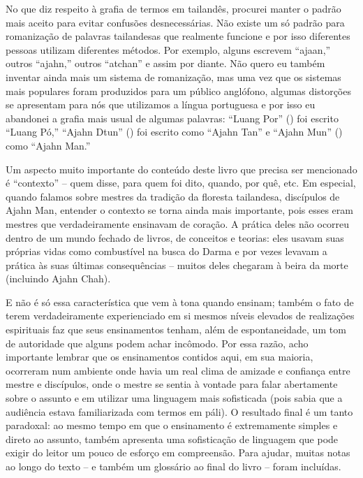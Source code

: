 No que diz respeito à grafia de termos em tailandês, procurei manter
o padrão mais aceito para evitar confusões desnecessárias. Não existe
um só padrão para romanização de palavras tailandesas que realmente
funcione e por isso diferentes pessoas utilizam diferentes métodos. Por
exemplo, alguns escrevem “ajaan,” outros “ajahn,” outros “atchan” e
assim por diante. Não quero eu também inventar ainda mais um sistema de
romanização, mas uma vez que os sistemas mais populares foram
produzidos para um público anglófono, algumas distorções se apresentam
para nós que utilizamos a língua portuguesa e por isso eu abandonei a
grafia mais usual de algumas palavras: “Luang Por” () foi escrito “Luang Pó,” “Ajahn Dtun” ()
foi escrito como “Ajahn Tan” e “Ajahn Mun” ()
como “Ajahn Man.” 

Um aspecto muito importante do conteúdo deste livro que precisa ser
mencionado é “contexto” – quem disse, para quem foi dito, quando, por
quê, etc. Em especial, quando falamos sobre mestres da tradição da
floresta tailandesa, discípulos de Ajahn Man, entender o contexto se
torna ainda mais importante, pois esses eram mestres que
verdadeiramente ensinavam de coração. A prática deles não ocorreu
dentro de um mundo fechado de livros, de conceitos e teorias: eles
usavam suas próprias vidas como combustível na busca do Darma e por
vezes levavam a prática às suas últimas consequências – muitos deles
chegaram à beira da morte (incluindo Ajahn Chah). 

E não é só essa característica que vem à tona quando ensinam; também
o fato de terem verdadeiramente experienciado em si mesmos níveis
elevados de realizações espirituais faz que seus ensinamentos tenham,
além de espontaneidade, um tom de autoridade que alguns podem achar
incômodo. Por essa razão, acho importante lembrar que os ensinamentos
contidos aqui, em sua maioria, ocorreram num ambiente onde havia um
real clima de amizade e confiança entre mestre e discípulos, onde o
mestre se sentia à vontade para falar abertamente sobre o assunto e em
utilizar uma linguagem mais sofisticada (pois sabia que a audiência
estava familiarizada com termos em páli). O resultado final é
um tanto paradoxal: ao mesmo tempo em que o ensinamento é extremamente
simples e direto ao assunto, também apresenta uma sofisticação de
linguagem que pode exigir do leitor um pouco de esforço em compreensão.
Para ajudar, muitas notas ao longo do texto – e também um glossário ao
final do livro – foram incluídas.

